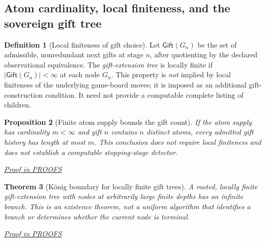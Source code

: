 \documentclass[11pt,letterpaper]{article}
\newtheorem{theorem}{Theorem}[section]
\newtheorem{proposition}[theorem]{Proposition}
\theoremstyle{definition}\newtheorem{definition}[theorem]{Definition}\newtheorem{example}[theorem]{Example}
\theoremstyle{remark}\newtheorem{remark}[theorem]{Remark}
\newcommand{\Gift}{\mathsf{Gift}}
\newcommand{\proofat}[1]{\par\smallskip\noindent\hfill\textit{\hyperref[#1]{Proof in PROOFS}}}
\begin{document}
\subsection{Atom cardinality, local finiteness, and the sovereign gift tree}
\begin{definition}[Local finiteness of gift choice]\label{w0:def:localfinite}
Let $\Gift(G_n)$ be the set of admissible, nonredundant next gifts at stage $n$, after quotienting by the declared observational equivalence. The \emph{gift-extension tree} is locally finite if $|\Gift(G_n)|<\infty$ at each node $G_n$. This property is \emph{not} implied by local finiteness of the underlying game-board moves; it is imposed as an additional gift-construction condition. It need not provide a computable complete listing of children.
\end{definition}

\begin{proposition}[Finite atom supply bounds the gift count]\label{w0:prop:atom-bound}
If the atom supply has cardinality $m<\infty$ and gift $n$ contains $n$ \emph{distinct} atoms, every admitted gift history has length at most $m$. This conclusion does not require local finiteness and does not establish a computable stopping-stage detector.\proofat{w0:pr:atom-bound}
\end{proposition}

\begin{theorem}[K\"onig boundary for locally finite gift trees]\label{w0:thm:konig}
A rooted, locally finite gift-extension tree with nodes at arbitrarily large finite depths has an infinite branch. This is an existence theorem, not a uniform algorithm that identifies a branch or determines whether the current node is terminal.\proofat{w0:pr:konig}
\end{theorem}
\end{document}
